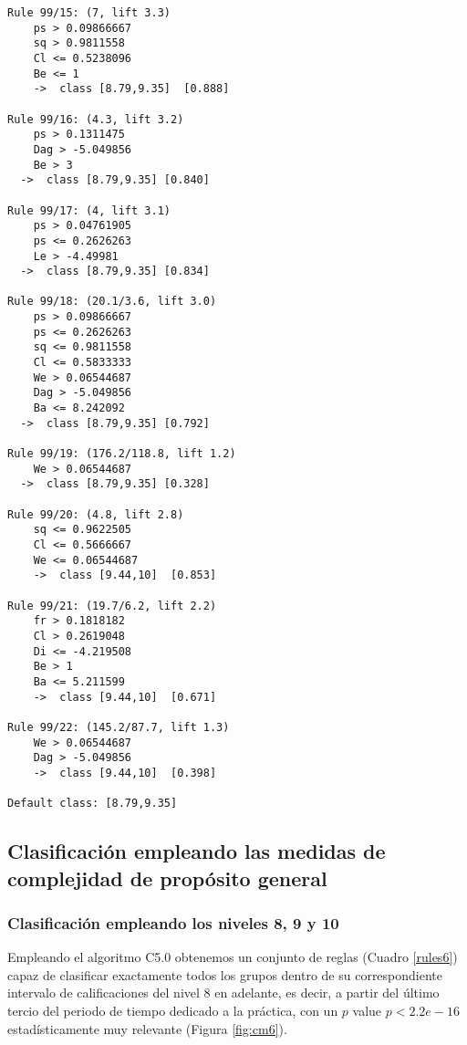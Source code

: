 \begin{tcolorbox}[title=Reglas de clasificación para identificar intervalos de notas.]
\begin{multicols}{3}
\begin{verbatim}
Rule 99/15: (7, lift 3.3)
	ps > 0.09866667
	sq > 0.9811558
	Cl <= 0.5238096
	Be <= 1
	->  class [8.79,9.35]  [0.888]

Rule 99/16: (4.3, lift 3.2)
	ps > 0.1311475
	Dag > -5.049856
	Be > 3
  ->  class [8.79,9.35] [0.840]

Rule 99/17: (4, lift 3.1)
	ps > 0.04761905
	ps <= 0.2626263
	Le > -4.49981
  ->  class [8.79,9.35] [0.834]

Rule 99/18: (20.1/3.6, lift 3.0)
	ps > 0.09866667
	ps <= 0.2626263
	sq <= 0.9811558
	Cl <= 0.5833333
	We > 0.06544687
	Dag > -5.049856
	Ba <= 8.242092
  ->  class [8.79,9.35] [0.792]

Rule 99/19: (176.2/118.8, lift 1.2)
	We > 0.06544687
  ->  class [8.79,9.35] [0.328]

Rule 99/20: (4.8, lift 2.8)
	sq <= 0.9622505
	Cl <= 0.5666667
	We <= 0.06544687
	->  class [9.44,10]  [0.853]

Rule 99/21: (19.7/6.2, lift 2.2)
	fr > 0.1818182
	Cl > 0.2619048
	Di <= -4.219508
	Be > 1
	Ba <= 5.211599
	->  class [9.44,10]  [0.671]

Rule 99/22: (145.2/87.7, lift 1.3)
	We > 0.06544687
	Dag > -5.049856
	->  class [9.44,10]  [0.398]
	
Default class: [8.79,9.35]
    \end{verbatim}
  \end{multicols}
\end{tcolorbox}

\subsection{Clasificación empleando las medidas de complejidad de propósito general}

\subsubsection{Clasificación empleando los niveles 8, 9 y 10}

Empleando el algoritmo C5.0 obtenemos un conjunto de reglas (Cuadro \ref{rules6}) capaz de clasificar exactamente todos los grupos dentro de su correspondiente intervalo de calificaciones del nivel $8$ en adelante, es decir, a partir del último tercio del periodo de tiempo dedicado a la práctica, con un $p$ value $p < 2.2e-16$ estadísticamente muy relevante (Figura \ref{fig:cm6}).

